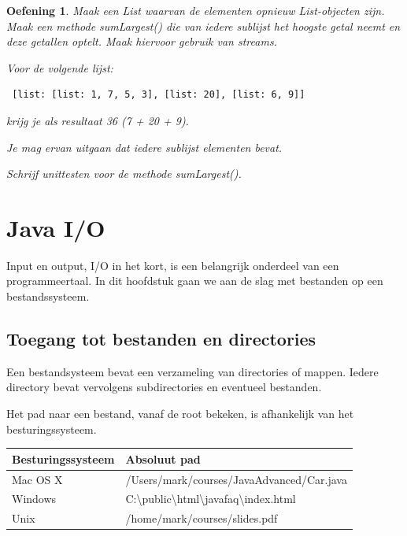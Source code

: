 \documentclass{tstextbook}
\newtheorem{envoefening}{Oefening}[chapter]
\newenvironment{oefening}
               {\begin{boxexercise}\begin{envoefening}}
               {\end{envoefening}\end{boxexercise}}
\begin{document}
\begin{oefening}

Maak een List waarvan de elementen opnieuw List-objecten zijn. Maak een methode sumLargest() die van iedere sublijst het hoogste getal neemt en deze getallen optelt. Maak hiervoor gebruik van streams.

Voor de volgende lijst:
\begin{verbatim}
 [list: [list: 1, 7, 5, 3], [list: 20], [list: 6, 9]]
\end{verbatim}
krijg je als resultaat 36 (7 + 20 + 9).

Je mag ervan uitgaan dat iedere sublijst elementen bevat. 

Schrijf unittesten voor de methode sumLargest().
 \end{oefening}
 
 
 \chapter{Java I/O}
 
 \begin{summary}
 Input en output, I/O in het kort, is een belangrijk onderdeel van een programmeertaal. 
 In dit hoofdstuk gaan we aan de slag met bestanden op een bestandssysteem.
 \end{summary}
 
 \section{Toegang tot bestanden en directories}
 
Een bestandsysteem bevat een verzameling van directories of mappen. Iedere directory bevat vervolgens subdirectories en eventueel bestanden.

Het pad naar een bestand, vanaf de root bekeken, is afhankelijk van het besturingssysteem.

\begin{table}[h!]
\centering
\begin{tabularx}{\textwidth}{| l | X |}
 \hline
 Besturingssysteem & Absoluut pad\\ 
 \hline
 Mac OS X & /Users/mark/courses/JavaAdvanced/Car.java \\
 Windows & C:\textbackslash public\textbackslash html\textbackslash javafaq\textbackslash index.html\\
 Unix & /home/mark/courses/slides.pdf \\
 \hline
 \end{tabularx}
 \end{table}
 
\end{document}
